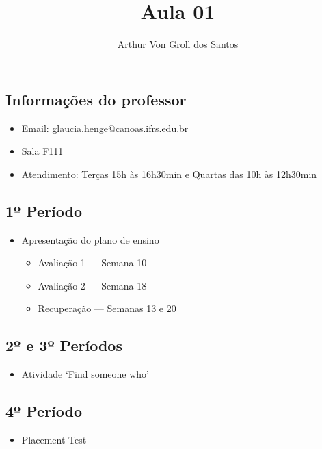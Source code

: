 \documentclass{article}
\author{Arthur Von Groll dos Santos}
\begin{document}
\title{Aula 01}
\maketitle

\begin{center}
    \section*{Informações do professor}    
\end{center}

\begin{itemize}
    \item Email: glaucia.henge@canoas.ifrs.edu.br
    \item Sala F111
    \item Atendimento: Terças 15h às 16h30min e
        Quartas das 10h às 12h30min
\end{itemize}

\begin{center}
    \section*{1º Período}
\end{center}

\begin{itemize}
    \item Apresentação do plano de ensino
        \begin{itemize}
            \item Avaliação 1 --- Semana 10
            \item Avaliação 2 --- Semana 18
            \item Recuperação --- Semanas 13 e 20
        \end{itemize}
\end{itemize}

\begin{center}
    \section*{2º e 3º Períodos}
\end{center}

\begin{center}
    \begin{itemize}
        \item Atividade `Find someone who'
    \end{itemize}
\end{center}

\begin{center}
    \section*{4º Período}
\end{center}

\begin{center}
    \begin{itemize}
        \item Placement Test
    \end{itemize}
\end{center}
\end{document}
